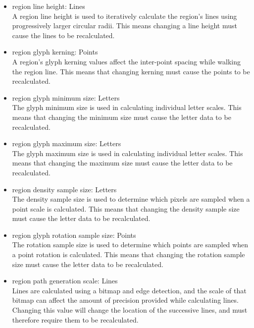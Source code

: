 \begin{itemize}
  \item region line height: Lines \\
        A region line height is used to iteratively calculate the region's lines using progressively larger circular radii.
        This means changing a line height must cause the lines to be recalculated.

  \item region glyph kerning: Points \\
        A region's glyph kerning values affect the inter-point spacing while walking the region line.
        This means that changing kerning must cause the points to be recalculated.

  \item region glyph minimum size: Letters \\
        The glyph minimum size is used in calculating individual letter scales.
        This means that changing the minimum size must cause the letter data to be recalculated.

  \item region glyph maximum size: Letters \\
        The glyph maximum size is used in calculating individual letter scales.
        This means that changing the maximum size must cause the letter data to be recalculated.

  \item region density sample size: Letters \\
        The density sample size is used to determine which pixels are sampled when a point scale is calculated.
        This means that changing the density sample size must cause the letter data to be recalculated.

  \item region glyph rotation sample size: Points \\
        The rotation sample size is used to determine which points are sampled when a point rotation is calculated.
        This means that changing the rotation sample size must cause the letter data to be recalculated.

  \item region path generation scale: Lines \\
        Lines are calculated using a bitmap and edge detection, and the scale of that bitmap can affect the amount of precision provided while calculating lines.
        Changing this value will change the location of the successive lines, and must therefore require them to be recalculated.
\end{itemize}

